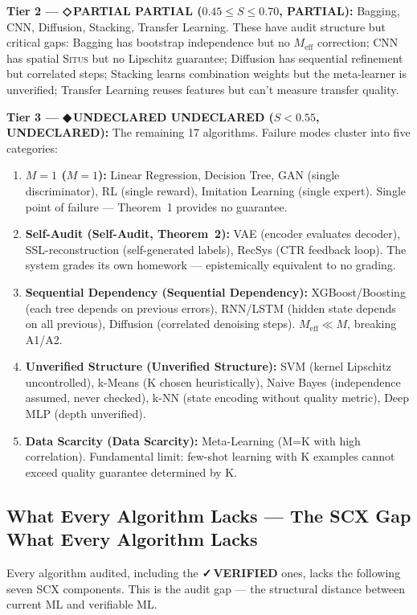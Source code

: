 \documentclass[12pt,a4paper]{article}
\theoremstyle{definition}
\newcommand{\guilty}{{\color{guiltycolor}\textbf{◆\,UNDECLARED}}}
\newcommand{\weakness}{{\color{weakcolor}\textbf{◇\,PARTIAL}}}
\newcommand{\verified}{{\color{verifiedcolor}\textbf{✓\,VERIFIED}}}
\newcommand{\Situs}{\textsc{Situs}}
\newcommand{\SCX}{\textsc{SCX}}
\begin{document}
\noindent\textbf{Tier 2 — \weakness{} PARTIAL ($0.45 \le S \le 0.70$, PARTIAL):} Bagging, CNN, Diffusion, Stacking, Transfer Learning. These have audit structure but critical gaps: Bagging has bootstrap independence but no $M_{\text{eff}}$ correction; CNN has spatial \Situs{} but no Lipschitz guarantee; Diffusion has sequential refinement but correlated steps; Stacking learns combination weights but the meta-learner is unverified; Transfer Learning reuses features but can't measure transfer quality.

\noindent\textbf{Tier 3 — \guilty{} UNDECLARED ($S < 0.55$, UNDECLARED):} The remaining 17 algorithms. Failure modes cluster into five categories:

\begin{enumerate}[label=\textbf{Failure \arabic*:}, nosep]
    \item \textbf{$M=1$ ($M=1$):} Linear Regression, Decision Tree, GAN (single discriminator), RL (single reward), Imitation Learning (single expert). Single point of failure — Theorem~1 provides no guarantee.
    \item \textbf{Self-Audit (Self-Audit, Theorem~2):} VAE (encoder evaluates decoder), SSL-reconstruction (self-generated labels), RecSys (CTR feedback loop). The system grades its own homework — epistemically equivalent to no grading.
    \item \textbf{Sequential Dependency (Sequential Dependency):} XGBoost/Boosting (each tree depends on previous errors), RNN/LSTM (hidden state depends on all previous), Diffusion (correlated denoising steps). $M_{\text{eff}} \ll M$, breaking A1/A2.
    \item \textbf{Unverified Structure (Unverified Structure):} SVM (kernel Lipschitz uncontrolled), k-Means (K chosen heuristically), Naive Bayes (independence assumed, never checked), k-NN (state encoding without quality metric), Deep MLP (depth unverified).
    \item \textbf{Data Scarcity (Data Scarcity):} Meta-Learning (M=K with high correlation). Fundamental limit: few-shot learning with K examples cannot exceed quality guarantee determined by K.
\end{enumerate}

\subsection{What Every Algorithm Lacks — The SCX Gap What Every Algorithm Lacks}

Every algorithm audited, including the \verified{} ones, lacks the following seven \SCX{} components. This is the audit gap — the structural distance between current ML and verifiable ML.
\end{document}
